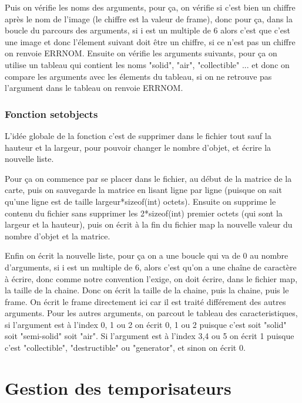 \documentclass[10pt,a4paper]{article}
\begin{document}
            Puis on vérifie les noms des arguments, pour ça, on vérifie si c'est bien un chiffre après le nom de l'image (le chiffre est la valeur de frame), donc pour ça, dans la boucle du parcours des arguments, si i est un multiple de 6 alors c'est que c'est une image et donc l'élement suivant doit être un chiffre, si ce n'est pas un chiffre on renvoie ERRNOM.
            Ensuite on vérifie les arguments suivants, pour ça on utilise un tableau qui contient les noms "solid", "air", "collectible" ... et donc on compare les arguments avec les élements du tableau, si on ne retrouve pas l'argument dans le tableau on renvoie ERRNOM.
            
        \subsubsection{Fonction setobjects}
            L'idée globale de la fonction c'est de supprimer dans le fichier tout sauf la hauteur et la largeur, pour pouvoir changer le nombre d'objet, et écrire la nouvelle liste.
            
            Pour ça on commence par se placer dans le fichier, au début de la matrice de la carte, puis on sauvegarde la matrice en lisant ligne par ligne (puisque on sait qu'une ligne est de taille largeur*sizeof(int) octets).
            Ensuite on supprime le contenu du fichier sans supprimer les 2*sizeof(int) premier octets (qui sont la largeur et la hauteur), puis on écrit à la fin du fichier map la nouvelle valeur du nombre d'objet et la matrice.
            
            Enfin on écrit la nouvelle liste, pour ça on a une boucle qui va de 0 au nombre d'arguments, si i est un multiple de 6, alors c'est qu'on a une chaîne de caractère à écrire, donc comme notre convention l'exige, on doit écrire, dans le fichier map, la taille de la chaine. Donc on écrit la taille de la chaine, puis la chaine, puis le frame. On écrit le frame directement ici car il est traité différement des autres arguments.
            Pour les autres arguments, on parcout le tableau des caracteristiques, si l'argument est à l'index 0, 1 ou 2  on écrit 0, 1 ou 2 puisque c'est soit "solid" soit "semi-solid" soit "air". Si l'argument est à l'index 3,4 ou 5 on écrit 1 puisque c'est "collectible", "destructible" ou "generator", et sinon on écrit 0. 
            
        
    
    
\section{Gestion des temporisateurs}
\end{document}

